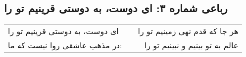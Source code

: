 \begin{center}
\section*{رباعی شماره ۳: ای دوست، به دوستی قرینیم تو را}
\label{sec:003}
\begin{longtable}{l p{0.5cm} r}
ای دوست، به دوستی قرینیم تو را
&&
هر جا که قدم نهی زمینیم تو را
\\
در مذهب عاشقی روا نیست که ما:
&&
عالم به تو بینیم و نبینیم تو را
\\
\end{longtable}
\end{center}
